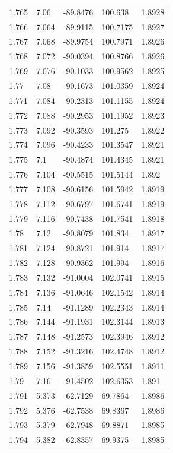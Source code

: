 \begin{tabular}{lllll}
1.765 & 7.06 & -89.8476 & 100.638 & 1.8928 \\
1.766 & 7.064 & -89.9115 & 100.7175 & 1.8927 \\
1.767 & 7.068 & -89.9754 & 100.7971 & 1.8926 \\
1.768 & 7.072 & -90.0394 & 100.8766 & 1.8926 \\
1.769 & 7.076 & -90.1033 & 100.9562 & 1.8925 \\
1.77 & 7.08 & -90.1673 & 101.0359 & 1.8924 \\
1.771 & 7.084 & -90.2313 & 101.1155 & 1.8924 \\
1.772 & 7.088 & -90.2953 & 101.1952 & 1.8923 \\
1.773 & 7.092 & -90.3593 & 101.275 & 1.8922 \\
1.774 & 7.096 & -90.4233 & 101.3547 & 1.8921 \\
1.775 & 7.1 & -90.4874 & 101.4345 & 1.8921 \\
1.776 & 7.104 & -90.5515 & 101.5144 & 1.892 \\
1.777 & 7.108 & -90.6156 & 101.5942 & 1.8919 \\
1.778 & 7.112 & -90.6797 & 101.6741 & 1.8919 \\
1.779 & 7.116 & -90.7438 & 101.7541 & 1.8918 \\
1.78 & 7.12 & -90.8079 & 101.834 & 1.8917 \\
1.781 & 7.124 & -90.8721 & 101.914 & 1.8917 \\
1.782 & 7.128 & -90.9362 & 101.994 & 1.8916 \\
1.783 & 7.132 & -91.0004 & 102.0741 & 1.8915 \\
1.784 & 7.136 & -91.0646 & 102.1542 & 1.8914 \\
1.785 & 7.14 & -91.1289 & 102.2343 & 1.8914 \\
1.786 & 7.144 & -91.1931 & 102.3144 & 1.8913 \\
1.787 & 7.148 & -91.2573 & 102.3946 & 1.8912 \\
1.788 & 7.152 & -91.3216 & 102.4748 & 1.8912 \\
1.789 & 7.156 & -91.3859 & 102.5551 & 1.8911 \\
1.79 & 7.16 & -91.4502 & 102.6353 & 1.891 \\
1.791 & 5.373 & -62.7129 & 69.7864 & 1.8986 \\
1.792 & 5.376 & -62.7538 & 69.8367 & 1.8986 \\
1.793 & 5.379 & -62.7948 & 69.8871 & 1.8985 \\
1.794 & 5.382 & -62.8357 & 69.9375 & 1.8985 \\

\end{tabular}
